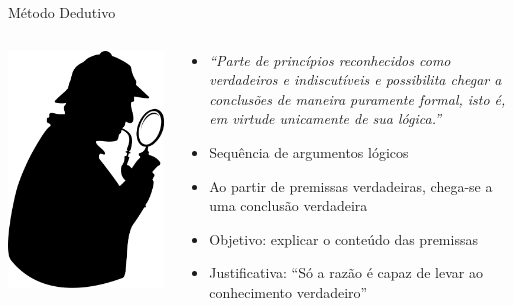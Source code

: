 \documentclass{beamer}
\begin{document}
\begin{frame}{Método Dedutivo}
  \begin{columns}
    \begin{column}{3cm}
    \includegraphics[width=\textwidth]{Metodos/sherlock_holmes}
    \end{column}
    \begin{column}{7.5cm}
      \begin{itemize}
        \footnotesize
      \item {\em``Parte de princípios reconhecidos como verdadeiros e
        indiscutíveis e possibilita chegar a conclusões de maneira
        puramente formal, isto é, em virtude unicamente de sua
        lógica.''}
      \bigskip
      \item Sequência de argumentos lógicos
      \bigskip
      \item Ao partir de premissas verdadeiras, chega-se a uma
        conclusão verdadeira
      \bigskip
      \item Objetivo: explicar o conteúdo das premissas
      \bigskip
      \item Justificativa: ``Só a razão é capaz de levar ao
        conhecimento verdadeiro''
      \end{itemize}
  \end{column}
\end{columns}
\end{frame}
\end{document}
